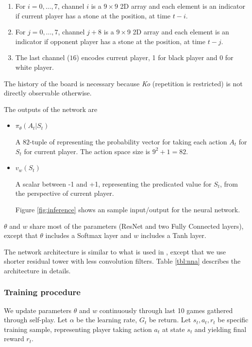 \documentclass{article}
\begin{document}
\begin{enumerate}
  \item
    For $i = 0, ..., 7$, channel $i$ is a $9 \times 9$ 2D array and each element is an indicator if current player has a stone at the position, at time $t-i$.
  \item
    For $j = 0, ..., 7$, channel $j+8$ is a $9 \times 9$ 2D array and each element is an indicator if opponent player has a stone at the position, at time $t-j$.
  \item
    The last channel ($16$) encodes current player, 1 for black player and 0 for white player.
\end{enumerate}
The history of the board is necessary because \textit{Ko} (repetition is restricted) is not directly observable otherwise.

The outputs of the network are 
\begin{itemize}
  \item
    $\pi_{\theta} (A_t|S_t)$

    A $82$-tuple of representing the probability vector for taking each action $A_t$ for $S_t$ for current player. The action space size is $9 ^2 + 1 = 82$.

  \item
    $v_w(S_t)$

    A scalar between -1 and +1, representing the predicated value for $S_t$, from the perspective of current player.

    Figure \ref{fig:inference} shows an sample input/output for the neural network.
\end{itemize}

$\theta$ and $w$ share most of the parameters (ResNet and two Fully Connected layers), except that $\theta$ includes a Softmax layer and $w$ includes a Tanh layer.

The network architecture is similar to what is used in \cite{silver2017masteringalphagozero}, except that we use shorter residual tower with less convolution filters.  Table \ref{tbl:nna} describes the architecture in details.


\subsubsection{Training procedure}
\label{sec:supervisedtraining}
We update parameters $\theta$ and $w$ continuously through last 10 games gathered through self-play.  Let $\alpha$ be the learning rate,  $G_t$ be return. Let $s_t, a_t, r_t$ be specific training sample, representing player taking action $a_t$ at state $s_t$ and yielding final reward $r_t$.
\end{document}
